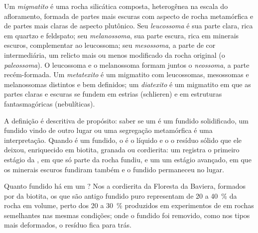 \begin{definition}\label{def:b2:crustal-melting:migmatite}
Um \emph{migmatito} é uma rocha silicática composta, heterogênea na
escala do afloramento, formada de partes mais escuras com aspecto de rocha metamórfica e de partes mais claras
de aspecto plutônico. Seu \emph{leucossoma} é sua parte clara, rica em quartzo e
feldspato; seu \emph{melanossoma}, sua parte escura, rica em minerais
escuros, complementar ao leucossoma; seu \emph{mesossoma}, a parte de cor
intermediária, um relicto mais ou menos modificado da rocha original (o \emph{paleossoma}). O
leucossoma e o melanossoma formam juntos o \emph{neossoma}, a parte recém-formada. Um
\emph{metatexito} é um migmatito com leucossomas, mesossomas e melanossomas
distintos e bem definidos; um \emph{diatexito} é um migmatito em que as partes claras e
escuras se fundem em estrias (schlieren) e em estruturas fantasmagóricas (nebulíticas).
\end{definition}

A definição é descritiva de propósito: saber se um  é um fundido solidificado, um fundido
vindo de outro lugar ou uma segregação metamórfica é uma interpretação. Quando é um
fundido, o  é o líquido e o  o resíduo sólido que ele deixou, enriquecido em
biotita, granada ou cordierita: um  registra o primeiro estágio da , em que
só parte da rocha fundiu, e um  um estágio avançado, em que os minerais escuros
fundiram também e o fundido permaneceu no lugar.

Quanto fundido há em um ? Nos  a cordierita da Floresta da Baviera,
formados por  da biotita, os  que são antigo fundido puro representam de 20 a
\qty{40}{\percent} da rocha em volume, perto dos 20 a \qty{30}{\percent} produzidos em
experimentos de  em rochas semelhantes nas mesmas condições; onde o fundido foi
removido, como nos tipos mais deformados, o resíduo fica para trás.

